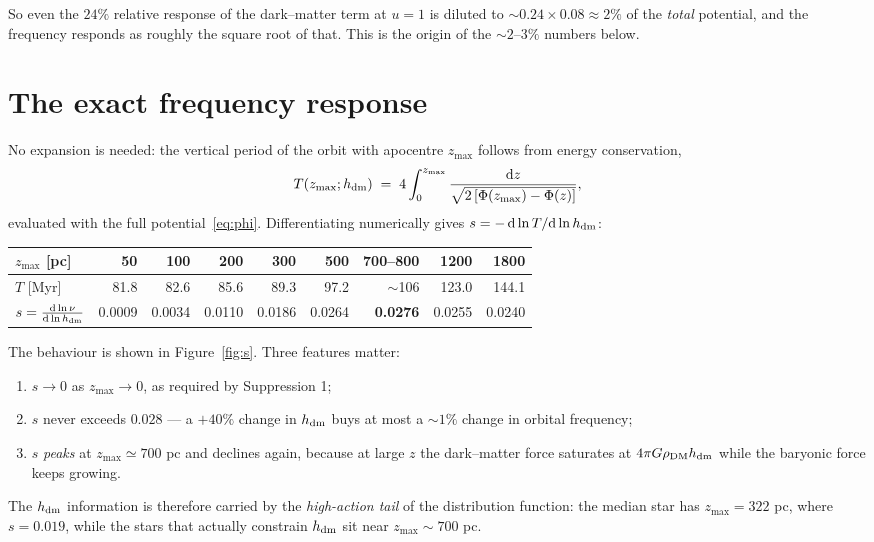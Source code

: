 \documentclass[11pt,a4paper]{article}
\newcommand{\hdm}{h_{\rm dm}}
\newcommand{\zmax}{z_{\max}}
\newcommand{\dlog}[2]{\frac{\mathrm{d}\ln #1}{\mathrm{d}\ln #2}}
\begin{document}
\noindent So even the $24\%$ relative response of the dark--matter term at $u=1$
is diluted to $\sim\!0.24\times0.08 \approx 2\%$ of the \emph{total} potential,
and the frequency responds as roughly the square root of that.  This is the
origin of the $\sim\!2$--$3\%$ numbers below.

\section{The exact frequency response}

No expansion is needed: the vertical period of the orbit with apocentre $\zmax$
follows from energy conservation,
\begin{equation}
  T(\zmax; \hdm) \;=\; 4\int_0^{\zmax}
    \frac{\mathrm{d}z}{\sqrt{2\left[\Phi(\zmax)-\Phi(z)\right]}},
  \label{eq:period}
\end{equation}
evaluated with the full potential~\eqref{eq:phi}.  Differentiating numerically
gives $s = -\,\mathrm{d}\ln T/\mathrm{d}\ln \hdm$:

\begin{center}
\begin{tabular}{lrrrrrrrr}
\toprule
$\zmax$ [pc] & 50 & 100 & 200 & 300 & 500 & \textbf{700--800} & 1200 & 1800 \\
\midrule
$T$ [Myr] & 81.8 & 82.6 & 85.6 & 89.3 & 97.2 & $\sim$106 & 123.0 & 144.1 \\
$s = \dlog{\nu}{\hdm}$ & 0.0009 & 0.0034 & 0.0110 & 0.0186 & 0.0264 & \textbf{0.0276} & 0.0255 & 0.0240 \\
\bottomrule
\end{tabular}
\end{center}

\noindent The behaviour is shown in Figure~\ref{fig:s}.  Three features matter:
\begin{enumerate}
\item $s\to0$ as $\zmax\to0$, as required by Suppression 1;
\item $s$ never exceeds $0.028$ --- a $+40\%$ change in $\hdm$ buys at most a
      $\sim\!1\%$ change in orbital frequency;
\item $s$ \emph{peaks} at $\zmax\simeq700$ pc and declines again, because at
      large $z$ the dark--matter force saturates at $4\pi G\rho_{\rm DM}\hdm$
      while the baryonic force keeps growing.
\end{enumerate}
The $\hdm$ information is therefore carried by the \emph{high-action tail} of the
distribution function: the median star has $\zmax = 322$ pc, where $s=0.019$,
while the stars that actually constrain $\hdm$ sit near $\zmax\sim700$ pc.
\end{document}
